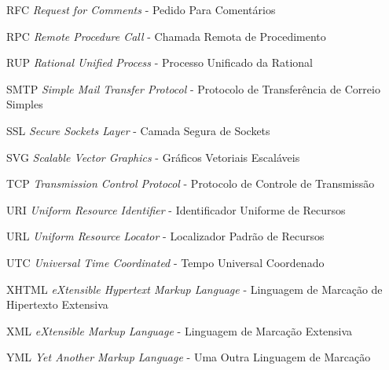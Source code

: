 \begin{siglas}
	\item[RFC] \textit{Request for Comments} - Pedido Para Comentários
	\item[RPC] \textit{Remote Procedure Call} - Chamada Remota de Procedimento\footnotemark[1]
	\item[RUP] \textit{Rational Unified Process} - Processo Unificado da Rational
	\item[SMTP] \textit{Simple Mail Transfer Protocol} - Protocolo de Transferência de Correio Simples
	\item[SSL] \textit{Secure Sockets Layer} - Camada Segura de Sockets
	\item[SVG] \textit{Scalable Vector Graphics} - Gráficos Vetoriais Escaláveis
	\item[TCP] \textit{Transmission Control Protocol} - Protocolo de Controle de Transmissão
	\item[URI] \textit{Uniform Resource Identifier} - Identificador Uniforme de Recursos
	\item[URL] \textit{Uniform Resource Locator} - Localizador Padrão de Recursos
	\item[UTC] \textit{Universal Time Coordinated} - Tempo Universal Coordenado
	\item[XHTML] \textit{eXtensible Hypertext Markup Language} - Linguagem de Marcação de Hipertexto Extensiva
	\item[XML] \textit{eXtensible Markup Language} - Linguagem de Marcação Extensiva
	\item[YML] \textit{Yet Another Markup Language} - Uma Outra Linguagem de Marcação\footnotemark[1]
\end{siglas}

